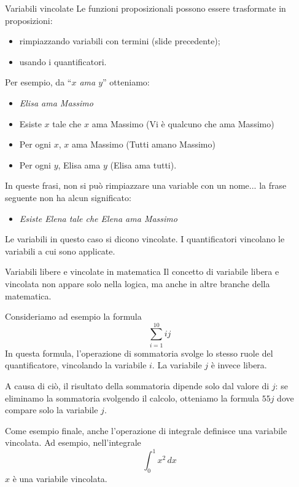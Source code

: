 \documentclass[aspectratio=169,10pt,dvipsnames]{beamer}
\begin{document}
\begin{frame}{Variabili vincolate}
	Le funzioni proposizionali possono essere trasformate in proposizioni:
	\begin{itemize}
		\item rimpiazzando variabili con termini (slide precedente);
		\item usando i quantificatori.
	\end{itemize}
	Per esempio, da  ``{\itshape $x$ ama $y$}'' otteniamo:
	{\itshape
	\begin{itemize}
		\item \itshape Elisa ama Massimo\\
		\item Esiste $x$ tale che $x$ ama Massimo (Vi è qualcuno che ama Massimo)\\
		\item Per ogni $x$, $x$ ama Massimo (Tutti amano Massimo)\\
		\item Per ogni $y$, Elisa ama $y$ (Elisa ama tutti).
	\end{itemize}
	}
	In queste frasi, non si può rimpiazzare una variable con un nome... la frase seguente non ha alcun significato:
	\begin{itemize}
	\item {\itshape Esiste Elena tale che Elena ama Massimo}\\
	\end{itemize}
	Le variabili in questo caso si dicono \alert{vincolate}. I quantificatori \alert{vincolano} le variabili a cui sono applicate.
\end{frame}

\begin{frame}{Variabili libere e vincolate in matematica}
	Il concetto di variabile libera e vincolata non appare solo nella logica, ma anche in altre branche della matematica.

	\medskip Consideriamo ad esempio la formula
	\[
		\sum_{i=1}^{10} ij
	\]
	In questa formula, l'operazione di sommatoria svolge lo stesso ruole del quantificatore, vincolando la variabile $i$. La variabile $j$ è invece libera.

	\medskip
	A causa di ciò, il risultato della sommatoria dipende solo dal valore di $j$: se eliminamo la sommatoria svolgendo il calcolo, otteniamo la formula $55 j$ dove compare solo la variabile $j$.

	\medskip
	Come esempio finale, anche l'operazione di integrale definisce una variabile vincolata. Ad esempio, nell'integrale
	\[
		\int_0^1 x^2 \, dx
	\]
	$x$ è una variabile vincolata.
\end{frame}
\end{document}

